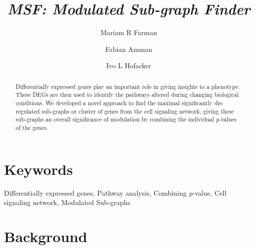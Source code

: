 \documentclass[twocolumn]{article}
\begin{document}
\title{\textit{MSF: Modulated Sub-graph Finder} }

\author[1]{Mariam R Farman}
\author[1,2]{Fabian Amman}
\author[1]{Ivo L Hofacker}



\maketitle

\begin{abstract}
Differentially expressed genes play an important role in giving
insights to a phenotype. These DEGs are then used to identify the
pathways altered during changing biological conditions. We developed a
novel approach to find the maximal significantly dis-regulated
sub-graphs or cluster of genes from the cell signaling network, giving
these sub-graphs an overall significance of modulation by combining the
individual \textit{p}-values of the genes.
\end{abstract}

\section*{Keywords}

Differentially expressed genes, Pathway analysis, Combining \textit{p}-value, Cell signaling network, Modulated Sub-graphs


\section*{Background}
\end{document}
